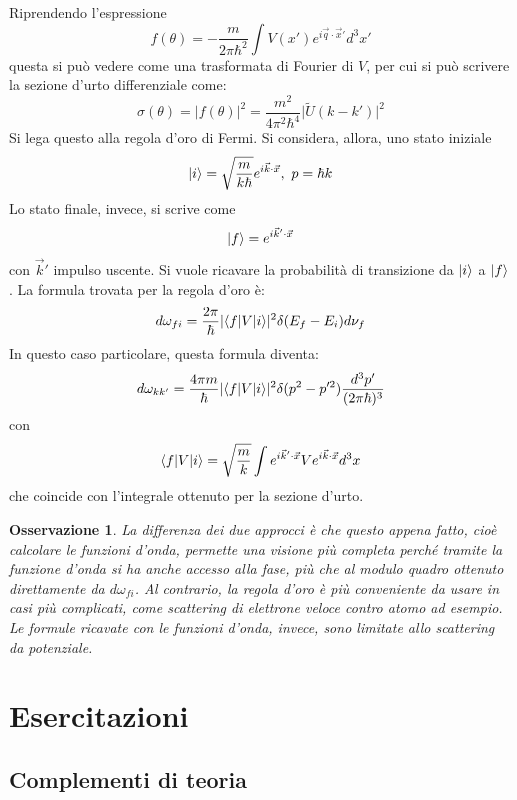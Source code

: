 \documentclass[11pt, a4paper]{scrartcl} %
\numberwithin{equation}{subsection}
\theoremstyle{style2}
\newtheorem{osservazione}{Osservazione}[section]
\theoremstyle{style1}
\begin{document}
Riprendendo l'espressione
\[
f(\theta ) = - \frac{m}{2\pi \hbar ^2}\int V(x') e^{i \vec{q}\cdot \vec{x}'} d^3 x'
\] 
questa si pu\`o vedere come una trasformata di Fourier di $V$, per cui si pu\`o scrivere la sezione d'urto differenziale come:
\begin{equation}
	\sigma (\theta ) = \lvert f(\theta ) \rvert ^2 = \frac{m^2}{4 \pi ^2 \hbar ^4} \lvert \widetilde{U}(k-k') \rvert ^2
\end{equation}
Si lega questo alla regola d'oro di Fermi.
Si considera, allora, uno stato iniziale 
\[
\ket{i} = \sqrt{\frac{m}{k\hbar }} e^{i\vec{k}\cdot \vec{x}} , \ p = \hbar  k
\] 
Lo stato finale, invece, si scrive come
\[
\ket{f}  = e^{i \vec{k}' \cdot \vec{x}} 
\] 
con $\vec{k}'$ impulso uscente.
Si vuole ricavare la probabilit\`a di transizione da $\ket{i} $ a $\ket{f} $.
La formula trovata per la regola d'oro \`e:
\[
d \omega_{fi} = \frac{2\pi}{\hbar }\lvert \braket{f|V|i}  \rvert ^2 \delta (E_f - E_i) d \nu _f
\] 
In questo caso particolare, questa formula diventa:
\[
d \omega_{kk'}  = \frac{4\pi m }{\hbar } \lvert \braket{f|V|i}  \rvert ^2 \delta (p^2-p'^2) \frac{d^3 p'}{(2\pi \hbar )^3}
\] 
con
\[
\braket{f|V|i}  = \sqrt{\frac{m}{k}} \int e^{i \vec{k}' \cdot \vec{x}} V e^{i\vec{k}\cdot \vec{x}} d^3 x
\] 
che coincide con l'integrale ottenuto per la sezione d'urto.
\begin{osservazione}
La differenza dei due approcci \`e che questo appena fatto, cio\`e calcolare le funzioni d'onda, permette una visione pi\`u completa perch\'e tramite la funzione d'onda si ha anche accesso alla fase, pi\`u che al modulo quadro ottenuto direttamente da $d\omega_{fi} $.
Al contrario, la regola d'oro \`e pi\`u conveniente da usare in casi pi\`u complicati, come scattering di elettrone veloce contro atomo ad esempio.
Le formule ricavate con le funzioni d'onda, invece, sono limitate allo scattering da potenziale.
\end{osservazione}




















\newpage
\section{Esercitazioni}
\subsection{Complementi di teoria}
\end{document}
